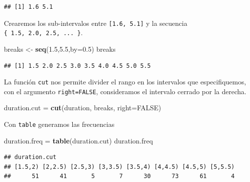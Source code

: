 \documentclass[]{article}
\newenvironment{Shaded}{\begin{snugshade}}{\end{snugshade}}
\newcommand{\KeywordTok}[1]{\textcolor[rgb]{0.13,0.29,0.53}{\textbf{{#1}}}}
\newcommand{\DataTypeTok}[1]{\textcolor[rgb]{0.13,0.29,0.53}{{#1}}}
\newcommand{\FloatTok}[1]{\textcolor[rgb]{0.00,0.00,0.81}{{#1}}}
\newcommand{\StringTok}[1]{\textcolor[rgb]{0.31,0.60,0.02}{{#1}}}
\newcommand{\OtherTok}[1]{\textcolor[rgb]{0.56,0.35,0.01}{{#1}}}
\newcommand{\NormalTok}[1]{{#1}}
\numberwithin{equation}{section}
\begin{document}
\begin{Shaded}
\end{Shaded}

\begin{verbatim}
## [1] 1.6 5.1
\end{verbatim}

Crearemos los sub-intervalos entre \texttt{{[}1.6,\ 5.1{]}} y la
secuencia \texttt{\{\ 1.5,\ 2.0,\ 2.5,\ ...\ \}}.

\begin{Shaded}
\begin{Highlighting}[]
\NormalTok{breaks <-}\StringTok{ }\KeywordTok{seq}\NormalTok{(}\FloatTok{1.5}\NormalTok{,}\FloatTok{5.5}\NormalTok{,}\DataTypeTok{by=}\FloatTok{0.5}\NormalTok{)}
\NormalTok{breaks}
\end{Highlighting}
\end{Shaded}

\begin{verbatim}
## [1] 1.5 2.0 2.5 3.0 3.5 4.0 4.5 5.0 5.5
\end{verbatim}

La función \texttt{cut} nos permite divider el rango en los intervalos
que especifiquemos, con el argumento \texttt{right=FALSE}, consideramos
el intervalo cerrado por la derecha.

\begin{Shaded}
\begin{Highlighting}[]
\NormalTok{duration.cut =}\StringTok{ }\KeywordTok{cut}\NormalTok{(duration, breaks, }\DataTypeTok{right=}\OtherTok{FALSE}\NormalTok{) }
\end{Highlighting}
\end{Shaded}

Con \texttt{table} generamos las frecuencias

\begin{Shaded}
\begin{Highlighting}[]
\NormalTok{duration.freq =}\StringTok{ }\KeywordTok{table}\NormalTok{(duration.cut) }
\NormalTok{duration.freq}
\end{Highlighting}
\end{Shaded}

\begin{verbatim}
## duration.cut
## [1.5,2) [2,2.5) [2.5,3) [3,3.5) [3.5,4) [4,4.5) [4.5,5) [5,5.5) 
##      51      41       5       7      30      73      61       4
\end{verbatim}
\end{document}
